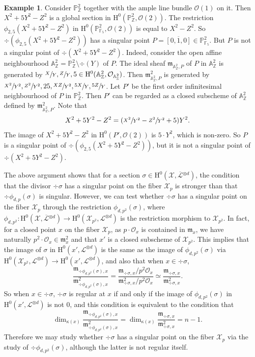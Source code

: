 \documentclass[11pt]{article}
\numberwithin{equation}{section}
\theoremstyle{plain}
\theoremstyle{definition}
\newtheorem*{expl}{Example}
\newcommand{\ho}{\mathrm{H}}
\newcommand{\m}{\mathfrak{m}}
\newcommand{\X}{\mathcal{X}}
\newcommand{\Li}{\overline{\mathcal{L}}{}}
\newcommand{\li}{\mathcal{L}}
\newcommand{\A}{\mathbb{A}}
\newcommand{\Z}{\mathbb{Z}}
\newcommand{\pr}{\mathbb{P}}
\newcommand{\F}{\mathbb{F}}
\begin{document}
\begin{expl}
Consider $\pr^2_{\Z}$ together with the ample line bundle $\mathcal{O}(1)$ on it. Then $X^2+5Y^2-Z^2$ is a global section in $\ho^0(\pr^2_{\Z}, \mathcal{O}(2))$. The restriction $\phi_{2,5}(X^2+5Y^2-Z^2)$ in $\ho^0(\pr^2_{\F_5}, \mathcal{O}(2))$ is equal to $X^2-Z^2$. So $\div (\phi_{2,5}(X^2+5Y^2-Z^2))$ has a singular point $P=\overline{[0,1,0]}\in \pr^2_{\F_5}$. But $P$ is not a singular point of $\div (X^2+5Y^2-Z^2)$. Indeed, consider the open affine neighbourhood $\A^2_{\Z}=\pr^2_{\Z}\setminus\div (Y)$ of $P$. The ideal sheaf $\mathfrak{m}_{\A^2_{\Z},P}$ of $P$ in $\A^2_{\Z}$ is generated by $\sfrac{X}{Y},\sfrac{Z}{Y},5\in \ho^0(\A^2_{\Z}, \mathcal{O}_{\A^2_{\Z}})$. Then $\mathfrak{m}^2_{\A^2_{\Z},P}$ is generated by $\sfrac{X^2}{Y^2}, \sfrac{Z^2}{Y^2}, 25, \sfrac{XZ}{Y^2}, \sfrac{5X}{Y},\sfrac{5Z}{Y}$. Let $P'$ be the first order infinitesimal neighbourhood of $P$ in $\pr^2_{\Z}$. Then $P'$ can be regarded as a closed subscheme of $\A^2_{\Z}$ defined by $\mathfrak{m}^2_{\A^2_{\Z},P}$. Note that
\begin{align*}
X^2+5Y^2-Z^2 = (\sfrac{X^2}{Y^2}-\sfrac{Z^2}{Y^2}+5)Y^2.
\end{align*}
The image of $X^2+5Y^2-Z^2$ in $\ho^0(P', \mathcal{O}(2))$ is $5\cdot Y^2$, which is non-zero. So $P$ is a singular point of $\div (\phi_{2,5}(X^2+5Y^2-Z^2))$, but it is not a singular point of $\div (X^2+5Y^2-Z^2)$.
\end{expl}

The above argument shows that for a section $\sigma \in \ho^0(\X,\Li^{\otimes d})$, the condition that the divisor $\div \sigma$ has a singular point on the fiber $\X_p$ is stronger than that $\div \phi_{d,p}(\sigma)$ is singular. However, we can test whether $\div \sigma$ has a singular point on the fiber $\X_p$ through the restriction $\phi_{d,p^2}(\sigma)$, where $\phi_{d,p^2}: \ho^0(\X, \Li^{\otimes d})\to \ho^0(\X_{p^2}, \li^{\otimes d})$ is the restriction morphism to $\X_{p^2}$. In fact, for a closed point $x$ on the fiber $\X_p$, as $p\cdot\mathcal{O}_x$ is contained in $\mathfrak{m}_x$, we have naturally $p^2\cdot\mathcal{O}_x\in \mathfrak{m}^2_x$ and that $x'$ is a closed subscheme of $\X_{p^2}$. This implies that the image of $\sigma$ in $\ho^0(x', \li^{\otimes d})$ is the same as the image of $\phi_{d,p^2}(\sigma)$ via $\ho^0(\X_{p^2}, \li^{\otimes d})\to \ho^0(x', \li^{\otimes d})$, and also that when $x\in \div \sigma$,
\[
\frac{\m_{\div \phi_{d,p^2}(\sigma),x}}{\m^2_{\div \phi_{d,p^2}(\sigma), x}}=\frac{\m_{\div \sigma,x}/p^2\mathcal{O}_x}{\m^2_{\div \sigma, x}/p^2\mathcal{O}_x}\simeq\frac{\m_{\div \sigma,x}}{\m^2_{\div \sigma, x}}.
\]
So when $x\in\div \sigma$, $\div \sigma$ is regular at $x$ if and only if the image of $\phi_{d,p^2}(\sigma)$ in $\ho^0(x', \li^{\otimes d})$ is not $0$, and this condition is equivalent to the condition that
\[
\dim_{\kappa(x)}\frac{\m_{\div \phi_{d,p^2}(\sigma),x}}{\m^2_{\div \phi_{d,p^2}(\sigma), x}}=\dim_{\kappa(x)}\frac{\m_{\div \sigma,x}}{\m^2_{\div \sigma, x}}=n-1.
\]
Therefore we may study whether $\div \sigma$ has a singular point on the fiber $\X_p$ via the study of $\div \phi_{d,p^2}(\sigma)$, although the latter is not regular itself.
\end{document}
